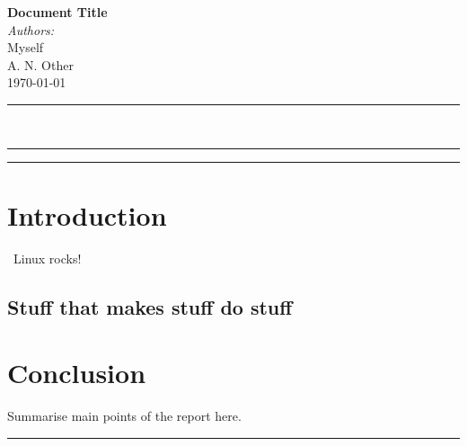 \documentclass[a4paper,10pt]{article}
\begin{document}
\begin{center}
	{ \huge \bfseries Document Title}\\[0.3cm]
	\emph{Authors:}\\
	Myself\\
	A. N. Other\\[0.5cm]
	\today
\end{center}

\noindent\rule{\linewidth}{0.2ex}
\textit{\lipsum[1]}\\
\noindent\rule{\linewidth}{0.2ex}
\tableofcontents
\noindent\rule{\linewidth}{0.2ex}
\begin{multicols}{2}


\section{Introduction}
\lipsum\ Linux rocks\cite{lunduke_half_2018}!
\subsection{Stuff that makes stuff do stuff}
\lipsum

\section{Conclusion}

Summarise main points of the report here.

\noindent\rule{\linewidth}{0.2ex}
\printbibliography
\end{multicols}
\end{document}
